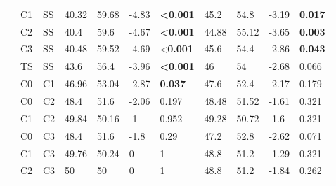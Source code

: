 \begin{table}[htp]
\begin{tabular}{l l l l l l l l l l l}
\\
 & C1 & SS & 40.32 & 59.68 & -4.83 & \textbf{\textless0.001}
& 45.2 & 54.8 & -3.19 & \textbf{0.017}
\\
 & C2 & SS & 40.4 & 59.6 & -4.67 & \textbf{\textless0.001}
& 44.88 & 55.12 & -3.65 & \textbf{0.003}
\\
 & C3 & SS & 40.48 & 59.52 & -4.69 & \textless\textbf{0.001}
& 45.6 & 54.4 & -2.86 & \textbf{0.043}
\\
 & TS & SS & 43.6 & 56.4 & -3.96 &\textbf{\textless0.001}
& 46 & 54 & -2.68 & 0.066
\\
 & C0 & C1 & 46.96 & 53.04 & -2.87 & \textbf{0.037}
& 47.6 & 52.4 & -2.17 & 0.179
\\
 & C0 & C2 & 48.4 & 51.6 & -2.06 & 0.197
& 48.48 & 51.52 & -1.61 & 0.321
\\
 & C1 & C2 & 49.84 & 50.16 & -1 & 0.952
& 49.28 & 50.72 & -1.6 & 0.321
\\
 & C0 & C3 & 48.4 & 51.6 & -1.8 & 0.29
& 47.2 & 52.8 & -2.62 & 0.071
\\
 & C1 & C3 & 49.76 & 50.24 & 0 & 1
& 48.8 & 51.2 & -1.29 & 0.321
\\
 & C2 & C3 & 50 & 50 & 0 & 1
& 48.8 & 51.2 & -1.84 & 0.262
\\

\end{tabular}
\label{tab:stats_analysis}
\end{table}

